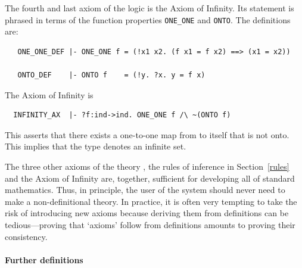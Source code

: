 \noindent
The fourth and last axiom of the \HOL{} logic is the Axiom of
Infinity. Its statement is phrased in terms of
the function properties {\small\verb+ONE_ONE+} and {\small\verb+ONTO+}. The
definitions are:

\begin{hol}
\begin{verbatim}
   ONE_ONE_DEF |- ONE_ONE f = (!x1 x2. (f x1 = f x2) ==> (x1 = x2))

   ONTO_DEF    |- ONTO f    = (!y. ?x. y = f x)
\end{verbatim}
\end{hol}

\noindent The Axiom of Infinity is
%
\begin{hol}
\begin{verbatim}
  INFINITY_AX  |- ?f:ind->ind. ONE_ONE f /\ ~(ONTO f)
\end{verbatim}
\end{hol}
%
\noindent
This asserts that there exists a one-to-one map from  to
itself that is not onto. This implies that the type 
denotes an infinite set.
%

The three other axioms of the theory , the rules of
inference in Section~\ref{rules} and the Axiom of Infinity are,
together, sufficient for developing all of standard mathematics. Thus,
in principle, the user of the \HOL{} system should never need to make a
non-definitional
%
%
theory. In practice, it is often very tempting to take the risk of
introducing new axioms because deriving them from definitions can be
tedious---proving that `axioms' follow from definitions amounts to
proving their consistency.

\paragraph {Further definitions}

